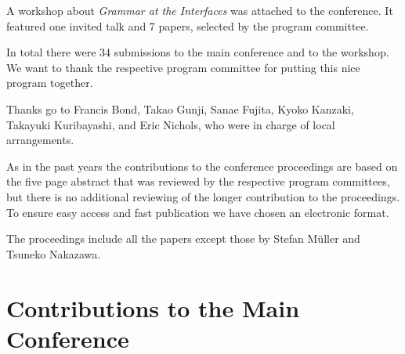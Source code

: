 \documentclass[11pt,a4paper,fleqn]{article}
\begin{document}
A workshop about \emph{Grammar at the Interfaces}
was attached to the conference. It featured one invited talk and 7 papers, selected by the program committee.

In total there were 34 submissions to the main conference and to the
workshop. 
We want to thank the respective program committee for putting this nice program together.



Thanks go to Francis Bond, Takao Gunji, Sanae Fujita, Kyoko Kanzaki, Taka\-yuki Kuribayashi, and Eric
Nichols, who were in charge of local arrangements.


As in the past years the contributions to the conference proceedings are based on the five page abstract
that was reviewed by the respective program committees, but there is no additional reviewing of the
longer contribution to the proceedings.
To ensure easy access and fast publication we have chosen an electronic format.


The proceedings include all the papers except those by Stefan Müller and Tsuneko Nakazawa.



\newpage
\part{Contributions to the Main Conference}
\thispagestyle{empty}
\newpage
        \setcounter{page}{6}
\thispagestyle{empty}
\end{document}
